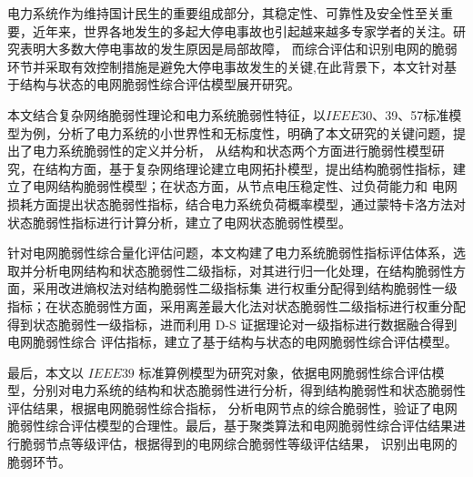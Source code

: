 \begin{cabstract}
  电力系统作为维持国计民生的重要组成部分，其稳定性、可靠性及安全性至关重要，近年来，世界各地发生的多起大停电事故也引起越来越多专家学者的关注。研究表明大多数大停电事故的发生原因是局部故障，
  而综合评估和识别电网的脆弱环节并采取有效控制措施是避免大停电事故发生的关键,在此背景下，本文针对基于结构与状态的电网脆弱性综合评估模型展开研究。
  
  
  本文结合复杂网络脆弱性理论和电力系统脆弱性特征，以$IEEE$30、39、57标准模型为例，分析了电力系统的小世界性和无标度性，明确了本文研究的关键问题，提出了电力系统脆弱性的定义并分析，
  从结构和状态两个方面进行脆弱性模型研究，在结构方面，基于复杂网络理论建立电网拓扑模型，提出结构脆弱性指标，建立了电网结构脆弱性模型；在状态方面，从节点电压稳定性、过负荷能力和
  电网损耗方面提出状态脆弱性指标，结合电力系统负荷概率模型，通过蒙特卡洛方法对状态脆弱性指标进行计算分析，建立了电网状态脆弱性模型。
  
  针对电网脆弱性综合量化评估问题，本文构建了电力系统脆弱性指标评估体系，选取并分析电网结构和状态脆弱性二级指标，对其进行归一化处理，在结构脆弱性方面，采用改进熵权法对结构脆弱性二级指标集
  进行权重分配得到结构脆弱性一级指标；在状态脆弱性方面，采用离差最大化法对状态脆弱性二级指标进行权重分配得到状态脆弱性一级指标，进而利用 D-S 证据理论对一级指标进行数据融合得到电网脆弱性综合
  评估指标，建立了基于结构与状态的电网脆弱性综合评估模型。
  
  最后，本文以 $IEEE39$ 标准算例模型为研究对象，依据电网脆弱性综合评估模型，分别对电力系统的结构和状态脆弱性进行分析，得到结构脆弱性和状态脆弱性评估结果，根据电网脆弱性综合指标，
  分析电网节点的综合脆弱性，验证了电网脆弱性综合评估模型的合理性。最后，基于聚类算法和电网脆弱性综合评估结果进行脆弱节点等级评估，根据得到的电网综合脆弱性等级评估结果，
  识别出电网的脆弱环节。
  


\end{cabstract}
